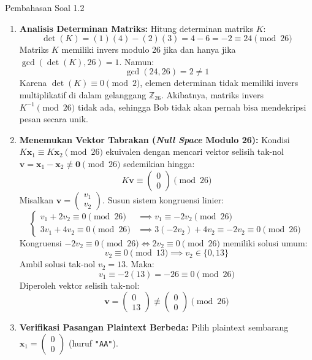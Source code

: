 \documentclass[11pt,a4paper]{article}
\begin{document}
\begin{solusibox}{Pembahasan Soal 1.2}
\begin{enumerate}[leftmargin=*]
    \item \textbf{Analisis Determinan Matriks:}
    Hitung determinan matriks $K$:
    \[
    \det(K) = (1)(4) - (2)(3) = 4 - 6 = -2 \equiv 24 \pmod{26}
    \]
    Matriks $K$ memiliki invers modulo 26 jika dan hanya jika $\gcd(\det(K), 26) = 1$. Namun:
    \[
    \gcd(24, 26) = 2 \neq 1
    \]
    Karena $\det(K) \equiv 0 \pmod 2$, elemen determinan tidak memiliki invers multiplikatif di dalam gelanggang $\mathbb{Z}_{26}$. Akibatnya, matriks invers $K^{-1} \pmod{26}$ tidak ada, sehingga Bob tidak akan pernah bisa mendekripsi pesan secara unik.
    \item \textbf{Menemukan Vektor Tabrakan (\textit{Null Space} Modulo 26):}
    Kondisi $K\mathbf{x}_1 \equiv K\mathbf{x}_2 \pmod{26}$ ekuivalen dengan mencari vektor selisih tak-nol $\mathbf{v} = \mathbf{x}_1 - \mathbf{x}_2 \not\equiv \mathbf{0} \pmod{26}$ sedemikian hingga:
    \[
    K \mathbf{v} \equiv \begin{pmatrix} 0 \\ 0 \end{pmatrix} \pmod{26}
    \]
    Misalkan $\mathbf{v} = \begin{pmatrix} v_1 \\ v_2 \end{pmatrix}$. Susun sistem kongruensi linier:
    \[
    \begin{cases}
    v_1 + 2v_2 \equiv 0 \pmod{26} & \implies v_1 \equiv -2v_2 \pmod{26} \\
    3v_1 + 4v_2 \equiv 0 \pmod{26} & \implies 3(-2v_2) + 4v_2 \equiv -2v_2 \equiv 0 \pmod{26}
    \end{cases}
    \]
    Kongruensi $-2v_2 \equiv 0 \pmod{26} \iff 2v_2 \equiv 0 \pmod{26}$ memiliki solusi umum:
    \[
    v_2 \equiv 0 \pmod{13} \implies v_2 \in \{0, 13\}
    \]
    Ambil solusi tak-nol $v_2 = 13$. Maka:
    \[
    v_1 \equiv -2(13) = -26 \equiv 0 \pmod{26}
    \]
    Diperoleh vektor selisih tak-nol:
    \[
    \mathbf{v} = \begin{pmatrix} 0 \\ 13 \end{pmatrix} \not\equiv \begin{pmatrix} 0 \\ 0 \end{pmatrix} \pmod{26}
    \]
    \item \textbf{Verifikasi Pasangan Plaintext Berbeda:}
    Pilih plaintext sembarang $\mathbf{x}_1 = \begin{pmatrix} 0 \\ 0 \end{pmatrix}$ (huruf \texttt{"AA"}).\\

\end{enumerate}
\end{solusibox}
\end{document}
